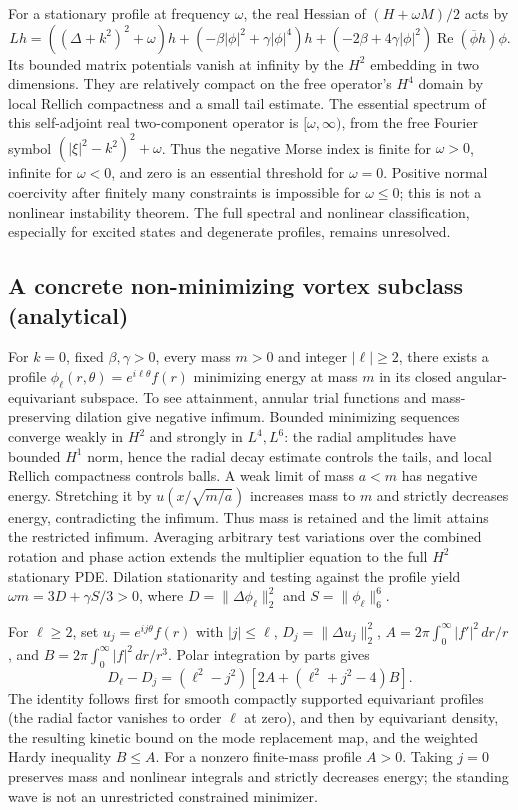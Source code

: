 \documentclass[11pt]{article}
\begin{document}
For a stationary profile at frequency \(\omega\), the real Hessian of
\((H+\omega M)/2\) acts by
\[
 Lh=((\Delta+k^2)^2+\omega)h
 +(-\beta|\phi|^2+\gamma|\phi|^4)h
 +(-2\beta+4\gamma|\phi|^2)\operatorname{Re}(\overline\phi h)\phi .
\]
Its bounded matrix potentials vanish at infinity by the \(H^2\)
embedding in two dimensions. They are relatively compact on the
free operator's \(H^4\) domain by local Rellich compactness and a
small tail estimate. The essential spectrum of this self-adjoint
real two-component operator is \([\omega,\infty)\), from the free
Fourier symbol \((|\xi|^2-k^2)^2+\omega\). Thus the negative Morse
index is finite for \(\omega>0\), infinite for \(\omega<0\),
and zero is an essential threshold for \(\omega=0\).
Positive normal coercivity after finitely many constraints is
impossible for \(\omega\le0\); this is not a nonlinear instability theorem.
The full spectral and nonlinear classification, especially for
excited states and degenerate profiles, remains unresolved.
\par

\subsection{A concrete non-minimizing vortex subclass (analytical)}
For \(k=0\), fixed \(\beta,\gamma>0\), every mass \(m>0\) and integer
\(|\ell|\ge2\), there exists a profile
\(\phi_\ell(r,\theta)=e^{i\ell\theta}f(r)\) minimizing energy at mass
\(m\) in its closed angular-equivariant subspace. To see attainment,
annular trial functions and mass-preserving dilation give negative
infimum. Bounded minimizing sequences converge weakly in \(H^2\)
and strongly in \(L^4,L^6\): the radial amplitudes have bounded
\(H^1\) norm, hence the radial decay estimate controls the tails,
and local Rellich compactness controls balls.
A weak limit of mass \(a<m\) has negative energy. Stretching it by
\(u(x/\sqrt{m/a})\) increases mass to \(m\) and strictly decreases
energy, contradicting the infimum. Thus mass is retained and the
limit attains the restricted infimum. Averaging arbitrary test
variations over the combined rotation and phase action extends the
multiplier equation to the full \(H^2\) stationary PDE. Dilation
stationarity and testing against the profile yield
\(\omega m=3D+\gamma S/3>0\), where
\(D=\|\Delta\phi_\ell\|_2^2\) and \(S=\|\phi_\ell\|_6^6\).

For \(\ell\ge2\), set \(u_j=e^{ij\theta}f(r)\) with \(|j|\le\ell\),
\(D_j=\|\Delta u_j\|_2^2\),
\(A=2\pi\int_0^\infty |f'|^2\,dr/r\), and
\(B=2\pi\int_0^\infty |f|^2\,dr/r^3\).
Polar integration by parts gives
\[
D_\ell-D_j=(\ell^2-j^2)[2A+(\ell^2+j^2-4)B].
\]
The identity follows first for smooth compactly supported equivariant
profiles (the radial factor vanishes to order \(\ell\) at zero), and
then by equivariant density, the resulting kinetic bound on the
mode replacement map, and the weighted Hardy inequality \(B\le A\).
For a nonzero finite-mass profile \(A>0\). Taking \(j=0\) preserves
mass and nonlinear integrals and strictly decreases energy; the
standing wave is not an unrestricted constrained minimizer.
\end{document}
